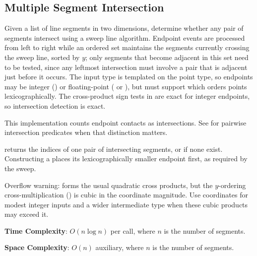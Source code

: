 \subsection{Multiple Segment Intersection}
\label{sec:7.3.10}
Given a list of line segments in two dimensions, determine whether any pair of segments intersect using a sweep line algorithm. Endpoint events are processed from left to right while an ordered set maintains the segments currently crossing the sweep line, sorted by $y$; only segments that become adjacent in this set need to be tested, since any leftmost intersection must involve a pair that is adjacent just before it occurs. The input type  is templated on the point type, so endpoints may be integer () or floating-point ( or ), but must support  which orders points lexicographically. The cross-product sign tests in  are exact for integer endpoints, so intersection detection is exact.

This implementation counts endpoint contacts as intersections. See  for pairwise intersection predicates when that distinction matters.

\begin{compactitem}
  \item {} returns the indices of one pair of intersecting segments, or  if none exist. Constructing a  places its lexicographically smaller endpoint first, as required by the sweep.
\end{compactitem}

Overflow warning:  forms the usual quadratic cross products, but the $y$-ordering cross-multiplication () is cubic in the coordinate magnitude. Use  coordinates for modest integer inputs and a wider intermediate type when these cubic products may exceed it.

\textbf{Time Complexity}: $O(n \log n)$ per call, where $n$ is the number of segments.

\textbf{Space Complexity}: $O(n)$ auxiliary, where $n$ is the number of segments.

